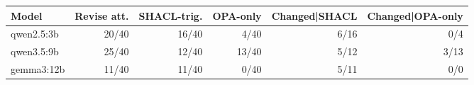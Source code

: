 \begin{tabular}{lrrrrr}
\hline
\textbf{Model} & \textbf{Revise att.} & \textbf{SHACL-trig.} & \textbf{OPA-only} & \textbf{Changed|SHACL} & \textbf{Changed|OPA-only} \\
\hline
qwen2.5:3b & 20/40 & 16/40 & 4/40 & 6/16 & 0/4 \\
qwen3.5:9b & 25/40 & 12/40 & 13/40 & 5/12 & 3/13 \\
gemma3:12b & 11/40 & 11/40 & 0/40 & 5/11 & 0/0 \\
\hline
\end{tabular}
